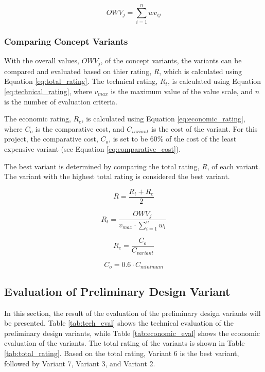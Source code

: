 \begin{equation}
    OWV_{j}=\sum_{i=1}^{n}wv_{ij}
    \label{eq:weighted_sum}
\end{equation}

\subsubsection{Comparing Concept Variants}
With the overall values, $OWV_{j}$, of the concept variants, the variants can be compared and evaluated based on thier rating, $R$, which is calculated using Equation \ref{eq:total_rating}. The technical rating, $R_{t}$, is calculated using Equation \ref{eq:technical_rating}, where $v_{max}$ is the maximum value of the value scale, and $n$ is the number of evaluation criteria.

The economic rating, $R_{e}$, is calculated using Equation \ref{eq:economic_rating}, where $C_{o}$ is the comparative cost, and $C_{variant}$ is the cost of the variant. For this project, the comparative cost, $C_{o}$, is set to be 60\% of the cost of the least expensive variant (see Equation \ref{eq:comparative_cost}).

The best variant is determined by comparing the total rating, $R$, of each variant. The variant with the highest total rating is considered the best variant.

\begin{equation}
    R=\frac{R_{t}+R_{e}}{2}
    \label{eq:total_rating}
\end{equation}

\begin{equation}
    R_t=\frac{OWV_{j}}{v_{max}\cdot\sum_{i=1}^{n}w_{i}}
    \label{eq:technical_rating}
\end{equation}

\begin{equation}
    R_e=\frac{C_{o}}{C_{variant}}
    \label{eq:economic_rating}
\end{equation}

\begin{equation}
    C_{o}=0.6\cdot C_{minimum}
    \label{eq:comparative_cost}
\end{equation}

\subsection{Evaluation of Preliminary Design Variant}
In this section, the result of the evaluation of the preliminary design variants will be presented. Table \ref{tab:tech_eval} shows the technical evaluation of the preliminary design variants, while Table \ref{tab:economic_eval} shows the economic evaluation of the variants. The total rating of the variants is shown in Table \ref{tab:total_rating}. Based on the total rating, Variant 6 is the best variant, followed by Variant 7, Variant 3, and Variant 2.

